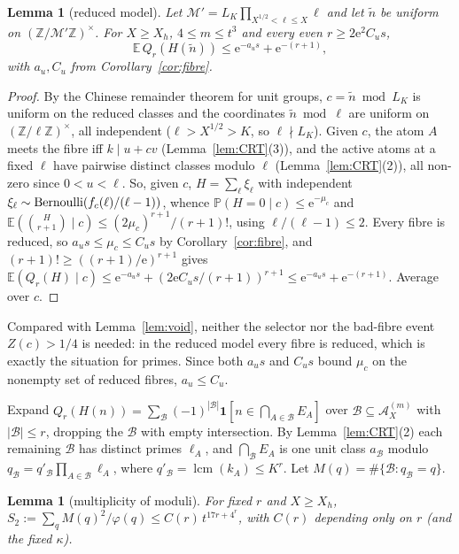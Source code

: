 \documentclass[10pt,reqno]{amsart}
\newtheorem{lemma}[theorem]{Lemma}
\theoremstyle{definition}
\newcommand{\Z}{\mathbb Z}
\newcommand{\A}{\mathcal A}
\newcommand{\M}{\mathcal M}
\newcommand{\E}{\mathbb E}
\newcommand{\Prob}{\mathbb P}
\newcommand{\ind}{\mathbf 1}
\newcommand{\lcm}{\operatorname{lcm}}
\newcommand{\e}{\mathrm e}
\begin{document}
\begin{lemma}[reduced model]\label{lem:reduced}
Let $\M'=L_K\prod_{X^{1/2}<\ell\leq X}\ell$ and let $\tilde n$ be
uniform on $(\Z/\M'\Z)^\times$.  For $X\geq X_h$, $4\leq m\leq t^3$
and every even $r\geq2\e^2C_us$,
\[
 \E\,Q_r(H(\tilde n))\leq\e^{-a_us}+\e^{-(r+1)},
\]
with $a_u,C_u$ from Corollary~\ref{cor:fibre}.
\end{lemma}

\begin{proof}
By the Chinese remainder theorem for unit groups, $c=\tilde n\bmod L_K$
is uniform on the reduced classes and the coordinates
$\tilde n\bmod\ell$ are uniform on $(\Z/\ell\Z)^\times$, all independent
($\ell>X^{1/2}>K$, so $\ell\nmid L_K$).  Given $c$, the atom $A$ meets
the fibre iff $k\mid u+cv$ (Lemma~\ref{lem:CRT}(3)), and the active
atoms at a fixed $\ell$ have pairwise distinct classes modulo $\ell$
(Lemma~\ref{lem:CRT}(2)), all non-zero since $0<u<\ell$.  So, given
$c$, $H=\sum_\ell\xi_\ell$ with independent
$\xi_\ell\sim{\rm Bernoulli}(f_c(\ell)/(\ell-1))$, whence
$\Prob(H=0\mid c)\leq\e^{-\mu_c}$ and
$\E(\binom H{r+1}\mid c)\leq(2\mu_c)^{r+1}/(r+1)!$, using
$\ell/(\ell-1)\leq2$.  Every fibre is reduced, so
$a_us\leq\mu_c\leq C_us$ by Corollary~\ref{cor:fibre}, and
$(r+1)!\geq((r+1)/\e)^{r+1}$ gives
$\E(Q_r(H)\mid c)\leq\e^{-a_us}+(2\e C_us/(r+1))^{r+1}
\leq\e^{-a_us}+\e^{-(r+1)}$.  Average over $c$.
\end{proof}

Compared with Lemma~\ref{lem:void}, neither the selector nor the
bad-fibre event $Z(c)>1/4$ is needed: in the reduced model every fibre
is reduced, which is exactly the situation for primes.  Since both
$a_us$ and $C_us$ bound $\mu_c$ on the nonempty set of reduced fibres,
$a_u\leq C_u$.

Expand
$Q_r(H(n))=\sum_{\mathcal B}(-1)^{|\mathcal B|}\ind[n\in\bigcap_{A\in\mathcal B}E_A]$
over $\mathcal B\subseteq\A^{(m)}_X$ with $|\mathcal B|\leq r$, dropping
the $\mathcal B$ with empty intersection.  By Lemma~\ref{lem:CRT}(2) each
remaining $\mathcal B$ has distinct primes $\ell_A$, and
$\bigcap_{\mathcal B}E_A$ is one unit class $a_{\mathcal B}$ modulo
$q_{\mathcal B}=q'_{\mathcal B}\prod_{A\in\mathcal B}\ell_A$, where
$q'_{\mathcal B}=\lcm(k_A)\leq K^r$.  Let
$M(q)=\#\{\mathcal B:q_{\mathcal B}=q\}$.

\begin{lemma}[multiplicity of moduli]\label{lem:mult}
For fixed $r$ and $X\geq X_h$,
$S_2:=\sum_qM(q)^2/\varphi(q)\leq C(r)\,t^{17r+4^r}$, with $C(r)$
depending only on $r$ \textup{(}and the fixed $\kappa$\textup{)}.
\end{lemma}
\end{document}
